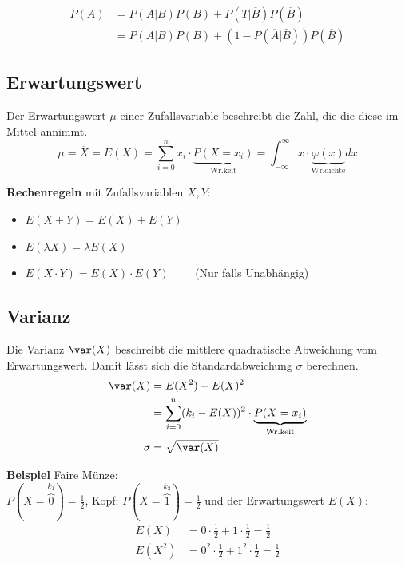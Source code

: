 \begin{align*}
	P(A) &=P(A|B)P(B) + P(T|\overline{B})P(\overline{B}) \\
	&= P(A|B)P(B) + (1 - P(\overline{A}|\overline{B}))P(\overline{B})
\end{align*}


\subsection{Erwartungswert}
Der Erwartungswert $\mu$ einer Zufallsvariable beschreibt die Zahl, die die diese im Mittel annimmt.
\[
\mu = \overline{X} = E(X)= \sum\limits_{i=0}^{n}x_i\cdot \underbrace{P(X=x_i)}_\text{Wr.keit} = \int_{-\infty}^{\infty}x\cdot \underbrace{\varphi(x)}_{\text{Wr.dichte}}dx
\]

\textbf{Rechenregeln} mit Zufallsvariablen $X, Y$:
\begin{itemize}[nosep]
	\item $E(X + Y) = E(X) + E(Y)$
	\item $E(\lambda X) = \lambda E(X)$ 
	\item $E(X\cdot Y) = E(X) \cdot E(Y) \qquad$  (Nur falls Unabhängig)
\end{itemize}

\subsection{Varianz}
Die Varianz $\var(X)$ beschreibt die mittlere quadratische Abweichung vom Erwartungswert. Damit lässt sich die Standardabweichung $\sigma$ berechnen.
\begin{align*}
	\var(X) &= E(X^2) - E(X)^2 \\
	&=\sum\limits_{i=0}^{n}(k_i - E(X))^2 \cdot \underbrace{P(X=x_i)}_\text{Wr.keit} \\
	\sigma &= \sqrt{\var(X)}	
\end{align*}

\noindent\textbf{Beispiel} Faire Münze:\\
$P(X = \overbrace{0}^{k_1}) = \frac{1}{2}$, Kopf: $P(X = \overbrace{1}^{k_2}) = \frac{1}{2}$ und der Erwartungswert $E(X)$: 
\begin{align*}
	E(X) &= 0\cdot \frac{1}{2} + 1\cdot\frac{1}{2} = \frac{1}{2} \\
	E(X^2) &= 0^2\cdot \frac{1}{2} + 1^2\cdot\frac{1}{2} = \frac{1}{2}
\end{align*}

